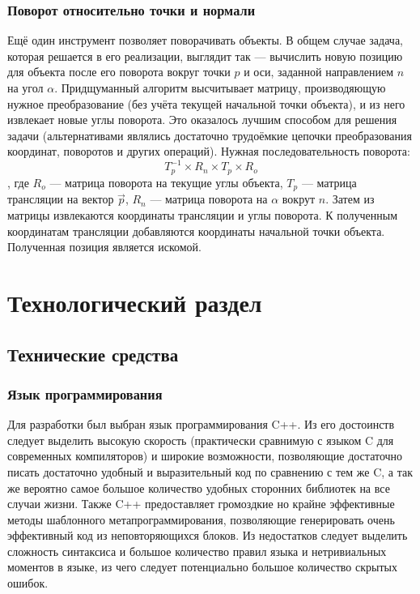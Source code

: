 \documentclass[a4paper,12pt]{report}
\numberwithin{equation}{section}
\begin{document}
\subsubsection{Поворот относительно точки и нормали}
Ещё один инструмент позволяет поворачивать объекты. В общем случае задача, которая решается в его реализации, выглядит так --- вычислить новую позицию для объекта после его поворота вокруг точки $p$ и оси, заданной направлением $n$ на угол $\alpha$. Придщуманный алгоритм высчитывает матрицу, производяющую нужное преобразование (без учёта текущей начальной точки объекта), и из него извлекает новые углы поворота. Это оказалось лучшим способом для решения задачи (альтернативами являлись достаточно трудоёмкие цепочки преобразования координат, поворотов и других операций). Нужная последовательность поворота:
\begin{equation}
T_p^{-1} \times R_n \times T_p \times R_o
\end{equation}
, где $R_o$ --- матрица поворота на текущие углы объекта, $T_p$ --- матрица трансляции на вектор $\vec{p}$, $R_n$ --- матрица поворота на $\alpha$ вокрут $n$. Затем из матрицы извлекаются координаты трансляции и углы поворота. К полученным координатам трансляции добавляются координаты начальной точки объекта. Полученная позиция является искомой.

\newpage
\section{Технологический раздел}

\subsection{Технические средства}

\subsubsection{Язык программирования}
Для разработки был выбран язык программирования C++. Из его достоинств следует выделить высокую скорость (практически сравнимую с языком C для современных компиляторов) \cite{languagebenchmark} и широкие возможности, позволяющие достаточно писать достаточно удобный и выразительный код по сравнению с тем же C, а так же вероятно самое большое количество удобных сторонних библиотек на все случаи жизни. Также C++ предоставляет громоздкие но крайне эффективные методы шаблонного метапрограммирования, позволяющие генерировать очень эффективный код из неповторяющихся блоков. Из недостатков следует выделить сложность синтаксиса и большое количество правил языка и нетривиальных моментов в языке, из чего следует потенциально большое количество скрытых ошибок.
\end{document}
